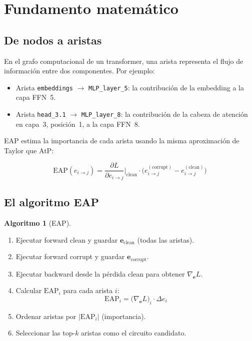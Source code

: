 \documentclass[11pt,a4paper]{report}
\theoremstyle{definition}
\newtheorem{algoritmo}{Algoritmo}[chapter]
\begin{document}
\section{Fundamento matemático}

\subsection{De nodos a aristas}

En el grafo computacional de un transformer, una arista representa el flujo de información entre dos componentes. Por ejemplo:

\begin{itemize}
    \item Arista \texttt{embeddings} $\to$ \texttt{MLP\_layer\_5}: la contribución de la embedding a la capa FFN~5.
    \item Arista \texttt{head\_3.1} $\to$ \texttt{MLP\_layer\_8}: la contribución de la cabeza de atención en capa~3, posición~1, a la capa FFN~8.
\end{itemize}

EAP estima la importancia de cada arista usando la misma aproximación de Taylor que AtP:

\[
\text{EAP}(e_{i \to j}) = \frac{\partial L}{\partial e_{i \to j}}\bigg|_{\text{clean}} \cdot \big(e_{i \to j}^{(\text{corrupt})} - e_{i \to j}^{(\text{clean})}\big)
\]

\subsection{El algoritmo EAP}

\begin{algoritmo}[EAP]
\label{alg:eap}
\begin{enumerate}
    \item Ejecutar forward clean y guardar $\mathbf{e}_{\text{clean}}$ (todas las aristas).
    \item Ejecutar forward corrupt y guardar $\mathbf{e}_{\text{corrupt}}$.
    \item Ejecutar backward desde la pérdida clean para obtener $\nabla_{\mathbf{e}} L$.
    \item Calcular $\text{EAP}_i$ para cada arista $i$:
    \[
    \text{EAP}_i = \big(\nabla_{\mathbf{e}} L\big)_i \cdot \Delta e_i
    \]
    \item Ordenar aristas por $|\text{EAP}_i|$ (importancia).
    \item Seleccionar las top-$k$ aristas como el circuito candidato.
\end{enumerate}
\end{algoritmo}
\end{document}

